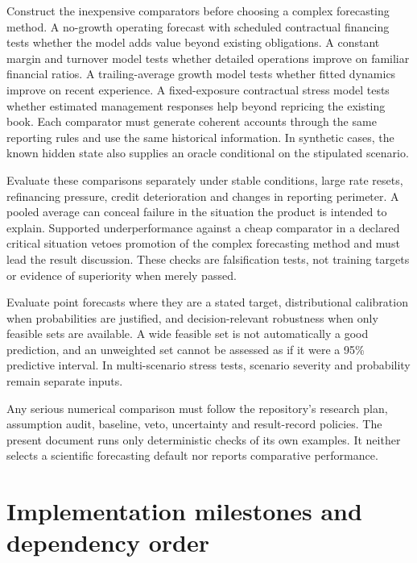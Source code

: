 Construct the inexpensive comparators before choosing a complex forecasting
method. A no-growth operating forecast with scheduled contractual financing
tests whether the model adds value beyond existing obligations. A constant
margin and turnover model tests whether detailed operations improve on familiar
financial ratios. A trailing-average growth model tests whether fitted dynamics
improve on recent experience. A fixed-exposure contractual stress model tests
whether estimated management responses help beyond repricing the existing
book. Each comparator must generate coherent accounts through the same reporting
rules and use the same historical information. In synthetic cases, the known
hidden state also supplies an oracle conditional on the stipulated scenario.

Evaluate these comparisons separately under stable conditions, large rate
resets, refinancing pressure, credit deterioration and changes in reporting
perimeter. A pooled average can conceal failure in the situation the product
is intended to explain. Supported underperformance against a cheap comparator
in a declared critical situation vetoes promotion of the complex forecasting
method and must lead the result discussion. These checks are falsification
tests, not training targets or evidence of superiority when merely passed.

Evaluate point forecasts where they are a stated target, distributional
calibration when probabilities are justified, and decision-relevant robustness
when only feasible sets are available. A wide feasible set is not automatically
a good prediction, and an unweighted set cannot be assessed as if it were a
95\% predictive interval. In multi-scenario stress tests, scenario severity and
probability remain separate inputs.

Any serious numerical comparison must follow the repository's research plan,
assumption audit, baseline, veto, uncertainty and result-record policies. The
present document runs only deterministic checks of its own examples. It
neither selects a scientific forecasting default nor reports comparative
performance.

\section{Implementation milestones and dependency order}

